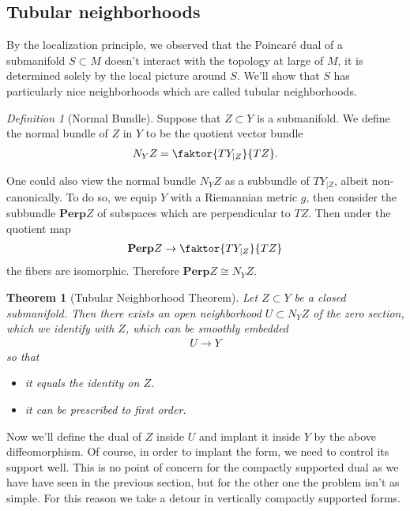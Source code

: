\documentclass[12pt]{amsart}
\newtheorem{theorem}{Theorem}
\theoremstyle{remark}
\newtheorem{definition}{Definition}
\begin{document}
 \subsection{Tubular neighborhoods}
 By the localization principle, we observed that the Poincaré dual of a submanifold $S \subset M$ doesn't interact with the topology at large of $M$, it is determined solely by the local picture around $S$. We'll show that $S$ has particularly nice  neighborhoods which are called  tubular neighborhoods. 
 \begin{definition}[Normal Bundle]
  Suppose that $ Z \subset Y$ is a submanifold. We define the normal bundle of $Z$ in $Y$ to be the quotient vector bundle
  \begin{align*}
      N_Y Z = \faktor{TY_{|Z}}{TZ} .
  \end{align*}
 \end{definition}
 One could also view the normal bundle $ N_Y Z$ as a subbundle of $TY_{|Z}$, albeit non-canonically. To do so, we equip $Y$ with a Riemannian metric $g$, then consider the subbundle $\textbf{Perp}Z$ of subspaces which are perpendicular to $TZ$. Then under the quotient map 
 \begin{align*}
     \textbf{Perp}Z \rightarrow \faktor{TY_{|Z}}{TZ}
 \end{align*}
 the fibers are isomorphic. Therefore $ \textbf{Perp} Z \cong N_Y Z$. 
\begin{theorem}[Tubular Neighborhood Theorem]
Let $ Z \subset Y$ be a closed submanifold. Then
there exists an open neighborhood $U \subset N_Y Z$ of the zero section, which we identify with $Z$, which can be smoothly embedded 
\begin{align*}
    U \rightarrow Y
 \end{align*}
 so that 
 \begin{itemize}
     \item it equals the identity on $Z$. 
     \item it can be prescribed to first order.
 \end{itemize}
\end{theorem}
Now we'll define the dual of $Z$ inside $U$ and implant it inside $Y$ by the above diffeomorphism. Of course, in order to implant the form, we need to control its support well. This is no point of concern for the compactly supported dual as we have have seen in the previous section, but for the other one the problem isn't as simple. For this reason we take a detour in vertically compactly supported forms. 
\end{document}
